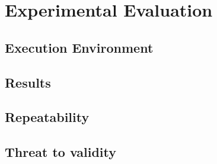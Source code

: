 \chapter{Experimental Evaluation}
\section{Execution Environment}


\section{Results}
\section{Repeatability}
\section{Threat to validity} %



